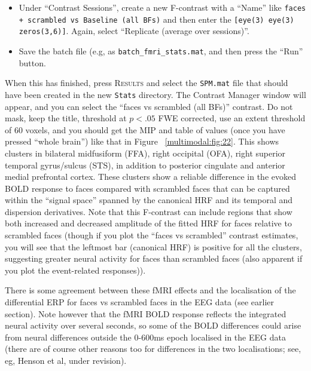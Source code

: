 \begin{itemize}
\item Under ``Contrast Sessions'', create a new F-contrast with a ``Name'' like \texttt{faces + scrambled vs Baseline (all BFs)} and then enter the \matlab \texttt{[eye(3) eye(3) zeros(3,6)]}. Again, select ``Replicate (average over sessions)''.

\item Save the batch file (e.g, as \texttt{batch\_fmri\_stats.mat}, and then press the ``Run'' button.

\end{itemize}

When this has finished, press \textsc{Results} and select the \texttt{SPM.mat} file that should have been created in the new \texttt{Stats} directory. The Contrast Manager window will appear, and you can select the ``faces vs scrambled (all BFs)'' contrast. Do not mask, keep the title, threshold at $p<.05$ FWE corrected, use an extent threshold of 60 voxels, and you should get the MIP and table of values (once you have pressed ``whole brain'') like that in Figure ~\ref{multimodal:fig:22}. This shows clusters in bilateral midfusiform (FFA), right occipital (OFA), right superior temporal gyrus/sulcus (STS), in addition to posterior cingulate and anterior medial prefrontal cortex. These clusters show a reliable difference in the evoked BOLD response to faces compared with scrambled faces that can be captured within the ``signal space'' spanned by the canonical HRF and its temporal and dispersion derivatives. Note that this F-contrast can include regions that show both increased and decreased amplitude of the fitted HRF for faces relative to scrambled faces (though if you plot the ``faces vs scrambled'' contrast estimates, you will see that the leftmost bar (canonical HRF) is positive for all the clusters, suggesting greater neural activity for faces than scrambled faces (also apparent if you plot the event-related responses)).

There is some agreement between these fMRI effects and the localisation of the differential ERP for faces vs scrambled faces in the EEG data (see earlier section). Note however that the fMRI BOLD response reflects the integrated neural activity over several seconds, so some of the BOLD differences could arise from neural differences outside the 0-600ms epoch localised in the EEG data (there are of course other reasons too for differences in the two localisations; see, eg, Henson et al, under revision).

